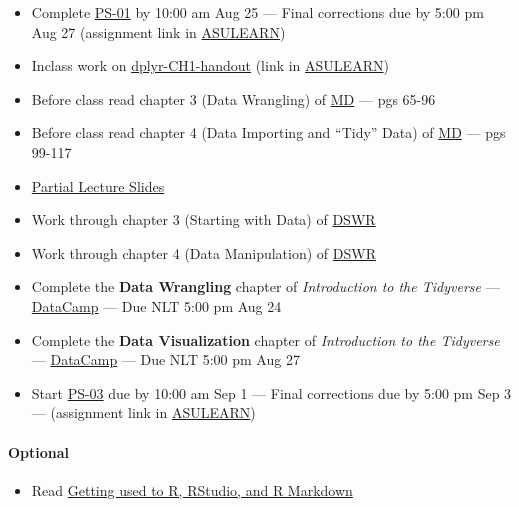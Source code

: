 \documentclass[
]{article}
\providecommand{\tightlist}{%
  \setlength{\itemsep}{0pt}\setlength{\parskip}{0pt}}
\begin{document}
\begin{itemize}
\item
  Complete
  \href{https://classroom.github.com/classrooms/87543903-stt3850-fall2021}{PS-01}
  by 10:00 am Aug 25 --- Final corrections due by 5:00 pm Aug 27
  (assignment link in
  \href{https://asulearn.appstate.edu/course/view.php?id=131169}{ASULEARN})
\item
  Inclass work on
  \href{https://classroom.github.com/classrooms/87543903-stt3850-fall2021}{dplyr-CH1-handout}
  (link in
  \href{https://asulearn.appstate.edu/course/view.php?id=131169}{ASULEARN})
\item
  Before class read chapter 3 (Data Wrangling) of
  \href{https://moderndive.com}{MD} --- pgs 65-96
\item
  Before class read chapter 4 (Data Importing and ``Tidy'' Data) of
  \href{https://moderndive.com}{MD} --- pgs 99-117
\item
  \href{../Handouts/pre_lecture.pdf}{Partial Lecture Slides}
\item
  Work through chapter 3 (Starting with Data) of
  \href{https://stat-ata-asu.github.io/R_DS_BD2020/}{DSWR}
\item
  Work through chapter 4 (Data Manipulation) of
  \href{https://stat-ata-asu.github.io/R_DS_BD2020/}{DSWR}
\item
  Complete the \textbf{Data Wrangling} chapter of \emph{Introduction to
  the Tidyverse} ---
  \href{https://app.datacamp.com/groups/stt3850-fall2021/assignments}{DataCamp}
  --- Due NLT 5:00 pm Aug 24
\item
  Complete the \textbf{Data Visualization} chapter of \emph{Introduction
  to the Tidyverse} ---
  \href{https://app.datacamp.com/groups/stt3850-fall2021/assignments}{DataCamp}
  --- Due NLT 5:00 pm Aug 27
\item
  Start
  \href{https://classroom.github.com/classrooms/87543903-stt3850-fall2021}{PS-03}
  due by 10:00 am Sep 1 --- Final corrections due by 5:00 pm Sep 3 ---
  (assignment link in
  \href{https://asulearn.appstate.edu/course/view.php?id=131169}{ASULEARN})
\end{itemize}

\begin{rmdoptional}
\hypertarget{optional}{%
\paragraph*{Optional}\label{optional}}

\begin{itemize}
\tightlist
\item
  Read \href{https://ismayc.github.io/rbasics-book/}{Getting used to R,
  RStudio, and R Markdown}
\end{itemize}
\end{rmdoptional}
\end{document}
